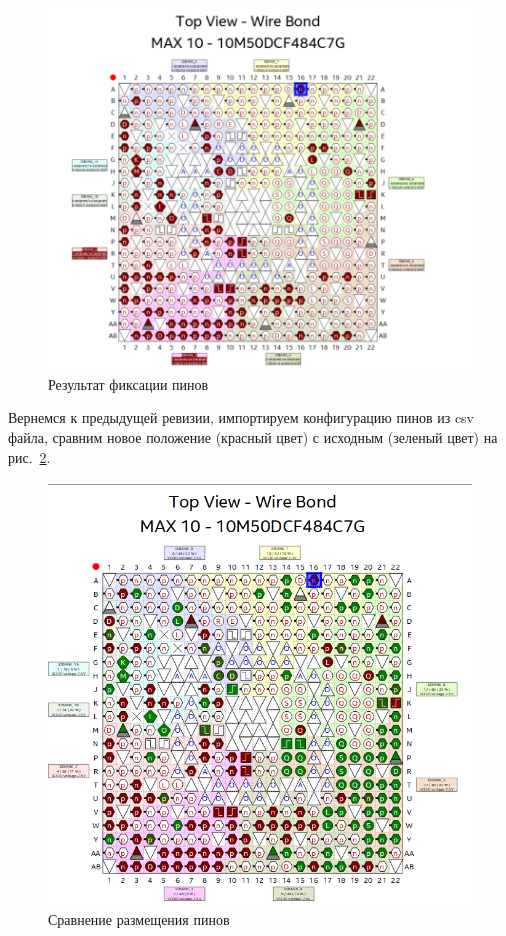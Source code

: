 \documentclass[a4paper,14pt]{article}
\begin{document}
\begin{figure}[H]
	\centering
	\includegraphics[width=\linewidth]{image/chip_2}
	\caption{Результат фиксации пинов}
	\label{fig:chip_2}
\end{figure}

Вернемся к предыдущей ревизии, импортируем конфигурацию пинов из csv файла, сравним новое положение (красный цвет) с исходным (зеленый цвет) на рис.~\ref{fig:chip_3}.

\begin{figure}[H]
	\centering
	\includegraphics[width=\linewidth]{image/chip_3}
	\caption{Сравнение размещения пинов}
	\label{fig:chip_3}
\end{figure}
\end{document}
